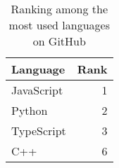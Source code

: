 \begin{table}[ht]
\centering
\caption{Ranking among the most used languages on GitHub \parencite{stateOfTheOctoverse23}}
\label{tab:githubMostUsedLanguageRanking23}
\begin{tabular}[t]{|l|r|}
\toprule
Language & Rank\\
\midrule
JavaScript & 1\\
Python & 2\\
TypeScript & 3\\
C++ & 6\\
\bottomrule
\end{tabular}
\end{table}
